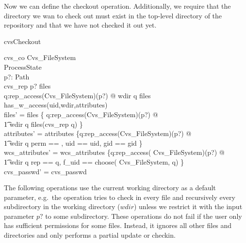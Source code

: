Now we can define the checkout operation.  Additionally, we require that the
directory we wan to check out must exist in the top-level directory of the
repository and that we have not checked it out yet.
\begin{doc}{cvsCheckout}
  \begin{schema}{cvs\_co} %
    \Delta Cvs\_FileSystem\\
    \Xi ProcessState \\
    p?: Path \\
    \where
    cvs\_rep \cat p? \in \dom files \\
    \forall q:rep\_access(\theta Cvs\_FileSystem)(p?) @ wdir \cat q \notin \dom
    files \\ 
    has\_w\_access(uid,wdir,attributes) \\

    files' = files \oplus \{ q:rep\_access(\theta Cvs\_FileSystem)(p?) @ \\
    \t1 wdir \cat q \mapsto files(cvs\_rep \cat q) \}  \\ 

    attributes' = attributes  \oplus \{q:rep\_access(\theta Cvs\_FileSystem)(p?)
    @ \\ 
    \t1 wdir \cat q \mapsto \lblot perm == \emptyset, uid == uid, gid == gid
    \rblot \} \\
    
    wcs\_attributes' = wcs\_attributes  \oplus \{q:rep\_access(\theta
    Cvs\_FileSystem)(p?) @ \\ 
    \t1 wdir \cat q \mapsto \lblot rep == q, f\_uid == choose(\theta
    Cvs\_FileSystem, q) \rblot \} \\
    cvs\_passwd' = cvs\_passwd \\
  \end{schema}
\end{doc}

The following operations use the current working directory as a default
parameter, e.g.\ the  operation tries to check in every file and
recursively every subdirectory in the working directory ($wdir$) unless we
restrict it with the input parameter $p?$ to some subdirectory.  These
operations do not fail if the user only has sufficient permissions for some
files.  Instead, it ignores all other files and directories and only performs a
partial update or checkin.

